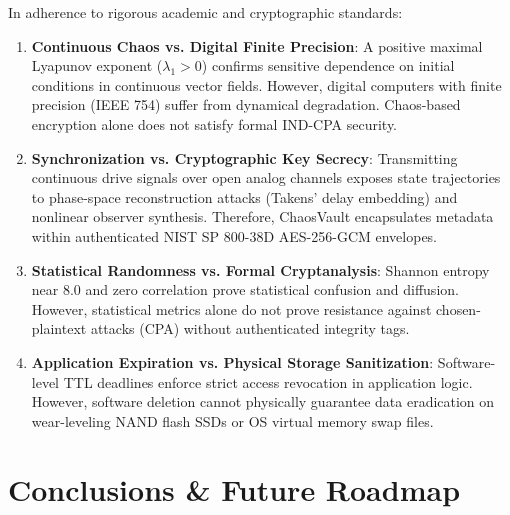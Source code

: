 \documentclass[12pt,a4paper,oneside]{report}
\begin{document}
In adherence to rigorous academic and cryptographic standards:
\begin{enumerate}
    \item \textbf{Continuous Chaos vs. Digital Finite Precision}: A positive maximal Lyapunov exponent ($\lambda_1 > 0$) confirms sensitive dependence on initial conditions in continuous vector fields. However, digital computers with finite precision (IEEE 754) suffer from dynamical degradation. Chaos-based encryption alone does not satisfy formal IND-CPA security.
    \item \textbf{Synchronization vs. Cryptographic Key Secrecy}: Transmitting continuous drive signals over open analog channels exposes state trajectories to phase-space reconstruction attacks (Takens' delay embedding) and nonlinear observer synthesis. Therefore, ChaosVault encapsulates metadata within authenticated NIST SP 800-38D AES-256-GCM envelopes.
    \item \textbf{Statistical Randomness vs. Formal Cryptanalysis}: Shannon entropy near $8.0$ and zero correlation prove statistical confusion and diffusion. However, statistical metrics alone do not prove resistance against chosen-plaintext attacks (CPA) without authenticated integrity tags.
    \item \textbf{Application Expiration vs. Physical Storage Sanitization}: Software-level TTL deadlines enforce strict access revocation in application logic. However, software deletion cannot physically guarantee data eradication on wear-leveling NAND flash SSDs or OS virtual memory swap files.
\end{enumerate}

\chapter{Conclusions \& Future Roadmap}
\end{document}
